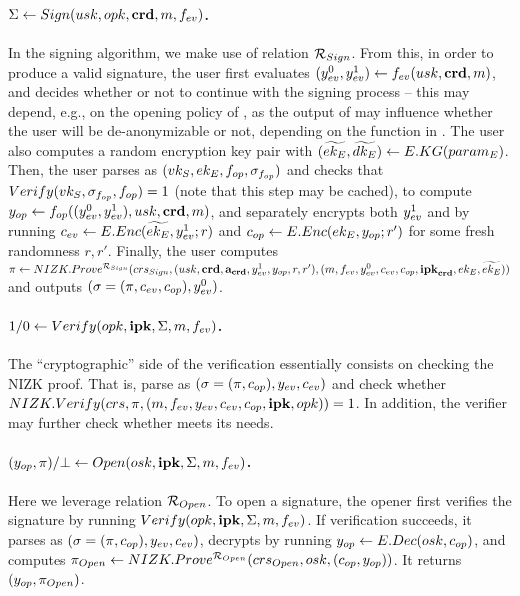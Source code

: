 \paragraph{$\Sigma \gets Sign(usk,opk,\mathbf{crd},m,f_{ev})$.} %
In the signing algorithm, we make use of relation $\mathcal{R}_{Sign}$.
% 
From this, in order to produce a valid signature, the user first evaluates
$(y_{ev}^0,y_{ev}^1) \gets f_{ev} (usk,\mathbf{crd},m)$, and decides whether or
not to continue with the signing process -- this may depend, e.g., on the
opening policy of \opk, as the output of \feval may influence whether the user
will be de-anonymizable or not, depending on the \finsp function in \opk.
%
The user also computes a random encryption key pair with $(\widetilde{ek_{E}},
\widetilde{dk_{E}}) \gets E.KG(param_{E})$. Then, the user parses \opk as $(vk_{S},ek_{E},
f_{op},\sigma_{f_{op}})$ and checks that $Verify(vk_{S},\sigma_{f_{op}},f_{op}) = 1$
(note that this step may be cached), to compute $y_{op} \gets f_{op}((y_{ev}^0,
y_{ev}^1),usk,\mathbf{crd},m)$, and separately encrypts both $y_{ev}^1$ and
\yinsp by running $c_{ev} \gets E.Enc(\widetilde{ek_{E}},y_{ev}^1;r)$ and $c_{op} \gets
E.Enc(ek_{E},y_{op}; r')$ for some fresh randomness $r,r'$. Finally, the user
computes $\pi \gets NIZK.Prove^{\mathcal{R}_{Sign}}(crs_{Sign},(usk,
\mathbf{crd}, \mathbf{a}_{\mathbf{crd}},y_{ev}^1,y_{op},r,r'),(m,f_{ev},y_{ev}^0,c_{ev},c_{op},
\mathbf{ipk}_{\mathbf{crd}},ek_{E},\widetilde{ek_{E}}))$ and outputs $(\sigma = (\pi,c_{ev},
c_{op}),y_{ev}^0)$.

\paragraph{$1/0 \gets Verify(opk,\mathbf{ipk},\Sigma,m,f_{ev})$.} %
The ``cryptographic'' side of the verification essentially consists on checking
the NIZK proof. That is, parse \Sig as $(\sigma = (\pi,c_{op}),y_{ev},
c_{ev})$ and check whether $NIZK.Verify(crs,\pi,(m,f_{ev},y_{ev},
c_{ev},c_{op},\mathbf{ipk},opk)) = 1$. In addition, the verifier may further check
whether \yeval meets its needs.

\paragraph{$(y_{op},\pi)/\bot \gets
  Open(osk,\mathbf{ipk},\Sigma,m,f_{ev})$.} %
Here we leverage relation $\mathcal{R}_{Open}$.
%
To open a signature, the opener first verifies the signature by running $Verify
(opk,\mathbf{ipk}, \Sigma,m,f_{ev})$. If verification succeeds, it parses
\Sig as $(\sigma=(\pi,c_{op}),y_{ev},c_{ev})$, decrypts \Ec by running $y_{op}
\gets E.Dec(osk,c_{op})$, and computes $\pi_{Open} \gets
NIZK.Prove^{\mathcal{R}_{Open}}(crs_{Open},osk,(c_{op},y_{op}))$. It
returns $(y_{op},\pi_{Open})$.

